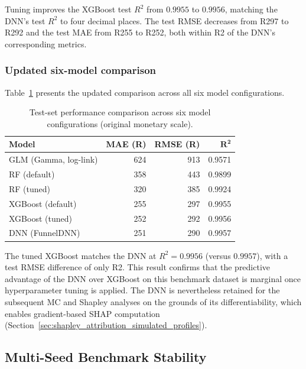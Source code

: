 \noindent
Tuning improves the XGBoost test $R^2$ from $0.9955$ to
$0.9956$, matching the DNN's test $R^2$ to four decimal places.
The test RMSE decreases from R297 to R292 and the test MAE
from R255 to R252, both within R2 of the DNN's corresponding
metrics.

\subsubsection{Updated six-model comparison}

Table~\ref{tab:six_model_comparison_ch4} presents the updated
comparison across all six model configurations.

\begin{table}[H]
\centering
\small
\renewcommand{\arraystretch}{1.15}
\begin{tabular}{lrrr}
\toprule
\textbf{Model} & \textbf{MAE (R)} & \textbf{RMSE (R)} &
$\boldsymbol{R^2}$ \\
\midrule
GLM (Gamma, log-link) & 624 & 913 & 0.9571 \\
RF (default) & 358 & 443 & 0.9899 \\
RF (tuned)   & 320 & 385 & 0.9924 \\
XGBoost (default) & 255 & 297 & 0.9955 \\
XGBoost (tuned)   & 252 & 292 & 0.9956 \\
DNN (FunnelDNN) & 251 & 290 & 0.9957 \\
\bottomrule
\end{tabular}
\caption{Test-set performance comparison across six model
configurations (original monetary scale).}
\label{tab:six_model_comparison_ch4}
\end{table}

\noindent
The tuned XGBoost matches the DNN at $R^2 = 0.9956$
(versus $0.9957$), with a test RMSE difference of only R2.  This
result confirms that the predictive advantage of the DNN over
XGBoost on this benchmark dataset is marginal once hyperparameter
tuning is applied.  The DNN is nevertheless retained for the
subsequent MC and Shapley analyses on the grounds of its
differentiability, which enables gradient-based SHAP computation
(Section~\ref{sec:shapley_attribution_simulated_profiles}).


\subsection{Multi-Seed Benchmark Stability}
\label{sec:multiseed_benchmark_stability}


